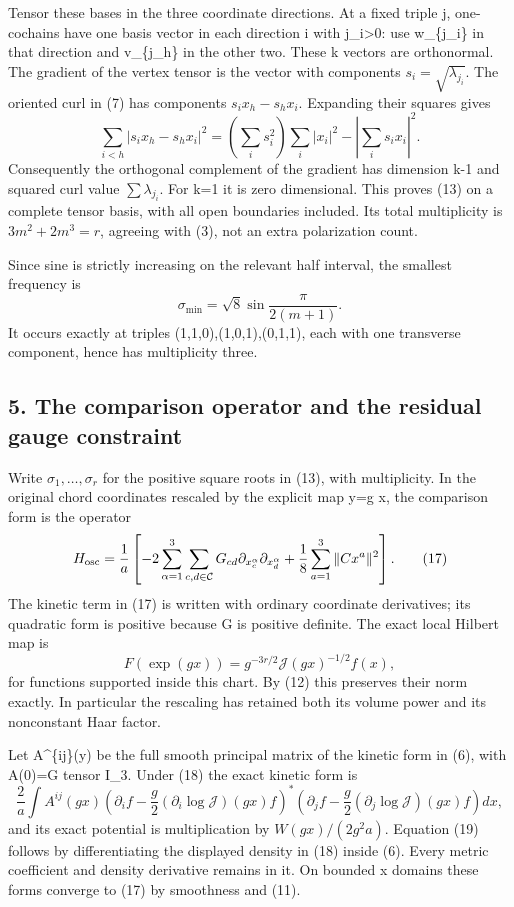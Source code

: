 \documentclass[
  11pt,
]{article}
\begin{document}
Tensor these bases in the three coordinate directions. At a fixed triple
j, one-cochains have one basis vector in each direction i with
j\_i\textgreater0: use w\_\{j\_i\} in that direction and v\_\{j\_h\} in
the other two. These k vectors are orthonormal. The gradient of the
vertex tensor is the vector with components
\(s_i=\sqrt{\lambda_{j_i}}\). The oriented curl in (7) has components
\(s_i x_h-s_h x_i\). Expanding their squares gives \[
 \sum_{i<h}|s_i x_h-s_h x_i|^2
  =\left(\sum_i s_i^2\right)\sum_i|x_i|^2
                  -\left|\sum_i s_i x_i\right|^2.
\tag{15}
\] Consequently the orthogonal complement of the gradient has dimension
k-1 and squared curl value \(\sum\lambda_{j_i}\). For k=1 it is zero
dimensional. This proves (13) on a complete tensor basis, with all open
boundaries included. Its total multiplicity is \(3m^2+2m^3=r\), agreeing
with (3), not an extra polarization count.

Since sine is strictly increasing on the relevant half interval, the
smallest frequency is \[
 \sigma_{\min}=\sqrt8\sin\frac{\pi}{2(m+1)}.
\tag{16}
\] It occurs exactly at triples (1,1,0),(1,0,1),(0,1,1), each with one
transverse component, hence has multiplicity three.

\subsection{5. The comparison operator and the residual gauge
constraint}\label{weak-coupling-part-1-the-comparison-operator-and-the-residual-gauge-constraint}

Write \(\sigma_1,\ldots,\sigma_r\) for the positive square roots in
(13), with multiplicity. In the original chord coordinates rescaled by
the explicit map y=g x, the comparison form is the operator \[
 H_{\rm osc}=\frac1a\left[-2\sum_{\alpha=1}^3\sum_{c,d\in\mathcal C}
                     G_{cd}\partial_{x_c^\alpha}\partial_{x_d^\alpha}
              +\frac18\sum_{a=1}^3\|Cx^a\|^2\right].
\tag{17}
\] The kinetic term in (17) is written with ordinary coordinate
derivatives; its quadratic form is positive because G is positive
definite. The exact local Hilbert map is \[
 F(\exp(gx))=g^{-3r/2}\mathcal J(gx)^{-1/2}f(x),
\tag{18}
\] for functions supported inside this chart. By (12) this preserves
their norm exactly. In particular the rescaling has retained both its
volume power and its nonconstant Haar factor.

Let A\^{}\{ij\}(y) be the full smooth principal matrix of the kinetic
form in (6), with A(0)=G tensor I\_3. Under (18) the exact kinetic form
is \[
 \frac2a\int A^{ij}(gx)
 \left(\partial_i f-\frac g2(\partial_i\log\mathcal J)(gx)f\right)^*
 \left(\partial_j f-\frac g2(\partial_j\log\mathcal J)(gx)f\right)dx,
\tag{19}
\] and its exact potential is multiplication by \(W(gx)/(2g^2a)\).
Equation (19) follows by differentiating the displayed density in (18)
inside (6). Every metric coefficient and density derivative remains in
it. On bounded x domains these forms converge to (17) by smoothness and
(11).
\end{document}
